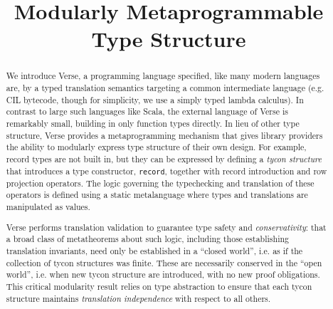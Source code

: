\documentclass[preprint]{sigplanconf}
\newcommand{\Verse}{{\textsf{\small Verse}}}
\begin{document}
\conferenceinfo{-}{-} 
\copyrightyear{-} 
\copyrightdata{[to be supplied]} 


\title{Modularly Metaprogrammable Type Structure}

\authorinfo{\vspace{-10px}}{}{}

\maketitle
\begin{abstract}
% 

We introduce \Verse, a programming language specified, like  many modern languages are, by a {typed translation semantics} targeting\- a common intermediate language (e.g. CIL bytecode, though for simplicity, we use a simply typed lambda calculus). In contrast to large such languages like Scala, the external language of {\Verse} is remarkably small, building in only function types directly. In lieu of other type structure, {\Verse} provides a metaprogramming mechanism that gives library providers the ability to modularly express type structure of their own design. For example, record types are not built in, but they can be  expressed by defining a \emph{tycon structure} that introduces a type constructor, \texttt{record}, 
together with record introduction and row projection operators. The logic governing the typechecking and translation of these operators is defined using a static metalanguage where types and translations are manipulated as values. %

{\Verse} performs translation validation to guarantee type safety and \emph{conservativity}: that a broad class of metatheorems about such logic, including those establishing {translation invariants}, need only be established in a ``closed world'', i.e. as if the collection of tycon  structures was finite. These are necessarily conserved in the ``open world'', i.e. when new tycon structure are introduced, with no new proof obligations. This critical modularity result relies on type abstraction to ensure that each tycon structure maintains \emph{translation independence} with respect to all others.
\end{abstract}
\end{document}
